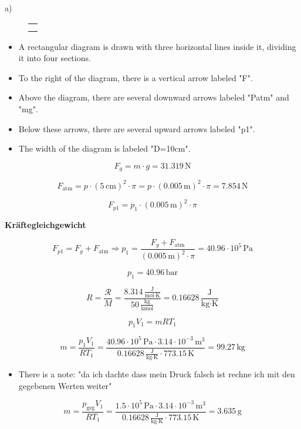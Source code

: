 a) \\

\begin{figure}[h!]
\centering
\begin{minipage}{0.3\textwidth}
\centering
\begin{tabular}{|c|}
\hline
\\
\hline
\\
\hline
\\
\hline
\end{tabular}
\end{minipage}
\end{figure}

\begin{itemize}
    \item A rectangular diagram is drawn with three horizontal lines inside it, dividing it into four sections.
    \item To the right of the diagram, there is a vertical arrow labeled "F".
    \item Above the diagram, there are several downward arrows labeled "Patm" and "mg".
    \item Below these arrows, there are several upward arrows labeled "p1".
    \item The width of the diagram is labeled "D=10cm".
\end{itemize}

\[
F_g = m \cdot g = 31.319 \, \text{N}
\]

\[
F_{\text{atm}} = p \cdot (5 \, \text{cm})^2 \cdot \pi = p \cdot (0.005 \, \text{m})^2 \cdot \pi = 7.854 \, \text{N}
\]

\[
F_{p1} = p_1 \cdot (0.005 \, \text{m})^2 \cdot \pi
\]

\textbf{Kräftegleichgewicht}

\[
F_{p1} = F_g + F_{\text{atm}} \Rightarrow p_1 = \frac{F_g + F_{\text{atm}}}{(0.005 \, \text{m})^2 \cdot \pi} = 40.96 \cdot 10^5 \, \text{Pa}
\]

\[
p_1 = 40.96 \, \text{bar}
\]

\[
R = \frac{\mathcal{R}}{M} = \frac{8.314 \, \frac{\text{J}}{\text{mol} \cdot \text{K}}}{50 \, \frac{\text{kg}}{\text{kmol}}} = 0.16628 \, \frac{\text{J}}{\text{kg} \cdot \text{K}}
\]

\[
p_1 V_1 = m R T_1
\]

\[
m = \frac{p_1 V_1}{R T_1} = \frac{40.96 \cdot 10^5 \, \text{Pa} \cdot 3.14 \cdot 10^{-3} \, \text{m}^3}{0.16628 \, \frac{\text{J}}{\text{kg} \cdot \text{K}} \cdot 773.15 \, \text{K}} = 99.27 \, \text{kg}
\]

\begin{itemize}
    \item There is a note: "da ich dachte dass mein Druck falsch ist rechne ich mit den gegebenen Werten weiter"
\end{itemize}

\[
m = \frac{p_{\text{geg}} V_1}{R T_1} = \frac{1.5 \cdot 10^5 \, \text{Pa} \cdot 3.14 \cdot 10^{-3} \, \text{m}^3}{0.16628 \, \frac{\text{J}}{\text{kg} \cdot \text{K}} \cdot 773.15 \, \text{K}} = 3.635 \, \text{g}
\]